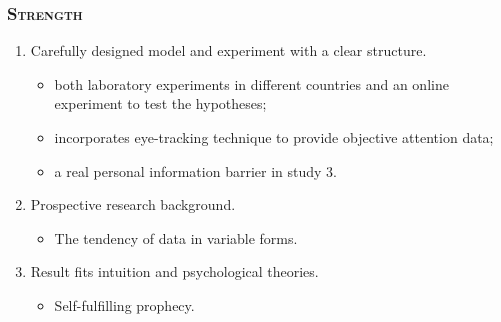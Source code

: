 \documentclass{../presentation}
\begin{document}
    \begin{frame}
        \frametitle{\textsc{Strength}}


        \begin{enumerate}
            \item Carefully designed model and experiment with a clear structure.
            \begin{itemize}
                \item both laboratory experiments in different countries and an online experiment to test the hypotheses;
                \item incorporates eye-tracking technique to provide objective attention data;
                \item a real personal information barrier in study 3.
            \end{itemize}
            \item Prospective research background.
            \begin{itemize}
                \item The tendency of data in variable forms.
            \end{itemize}
            \item Result fits intuition and psychological theories.
            \begin{itemize}
                \item Self-fulfilling prophecy.
            \end{itemize}
        \end{enumerate}

    \end{frame}
\end{document}
